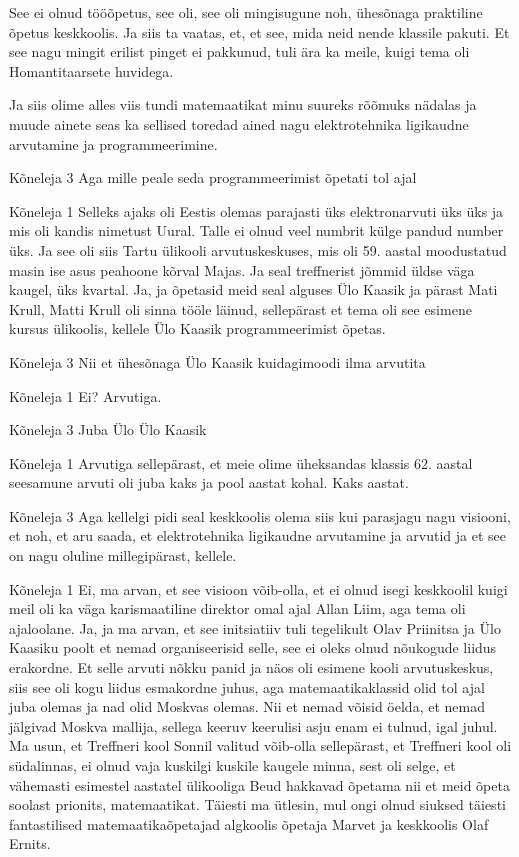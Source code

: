 See ei olnud tööõpetus, see oli, see oli mingisugune noh, ühesõnaga praktiline õpetus keskkoolis. Ja siis ta vaatas, et, et see, mida neid nende klassile pakuti. Et see nagu mingit erilist pinget ei pakkunud, tuli ära ka meile, kuigi tema oli Homantitaarsete huvidega. 

Ja siis olime alles viis tundi matemaatikat minu suureks rõõmuks nädalas ja muude ainete seas ka sellised toredad ained nagu elektrotehnika ligikaudne arvutamine ja programmeerimine. 

Kõneleja 3
Aga mille peale seda programmeerimist õpetati tol ajal 

Kõneleja 1
Selleks ajaks oli Eestis olemas parajasti üks elektronarvuti üks üks ja mis oli kandis nimetust Uural. Talle ei olnud veel numbrit külge pandud number üks. Ja see oli siis Tartu ülikooli arvutuskeskuses, mis oli 59. aastal moodustatud masin ise asus peahoone kõrval Majas. Ja seal treffnerist jõmmid üldse väga kaugel, üks kvartal. Ja, ja õpetasid meid seal alguses Ülo Kaasik ja pärast Mati Krull, Matti Krull oli sinna tööle läinud, sellepärast et tema oli see esimene kursus ülikoolis, kellele Ülo Kaasik programmeerimist õpetas. 

Kõneleja 3
Nii et ühesõnaga Ülo Kaasik kuidagimoodi ilma arvutita 

Kõneleja 1
Ei? Arvutiga. 

Kõneleja 3
Juba Ülo Ülo Kaasik 

Kõneleja 1
Arvutiga sellepärast, et meie olime üheksandas klassis 62. aastal seesamune arvuti oli juba kaks ja pool aastat kohal. Kaks aastat. 

Kõneleja 3
Aga kellelgi pidi seal keskkoolis olema siis kui parasjagu nagu visiooni, et noh, et aru saada, et elektrotehnika ligikaudne arvutamine ja arvutid ja et see on nagu oluline millegipärast, kellele. 

Kõneleja 1
Ei, ma arvan, et see visioon võib-olla, et ei olnud isegi keskkoolil kuigi meil oli ka väga karismaatiline direktor omal ajal Allan Liim, aga tema oli ajaloolane. Ja, ja ma arvan, et see initsiatiiv tuli tegelikult Olav Priinitsa ja Ülo Kaasiku poolt et nemad organiseerisid selle, see ei oleks olnud nõukogude liidus erakordne. Et selle arvuti nõkku panid ja näos oli esimene kooli arvutuskeskus, siis see oli kogu liidus esmakordne juhus, aga matemaatikaklassid olid tol ajal juba olemas ja nad olid Moskvas olemas. Nii et nemad võisid öelda, et nemad jälgivad Moskva mallija, sellega keeruv keerulisi asju enam ei tulnud, igal juhul. Ma usun, et Treffneri kool Sonnil valitud võib-olla sellepärast, et Treffneri kool oli südalinnas, ei olnud vaja kuskilgi kuskile kaugele minna, sest oli selge, et vähemasti esimestel aastatel ülikooliga Beud hakkavad õpetama nii et meid õpeta soolast prionits, matemaatikat. Täiesti ma ütlesin, mul ongi olnud siuksed täiesti fantastilised matemaatikaõpetajad algkoolis õpetaja Marvet ja keskkoolis Olaf Ernits. 

